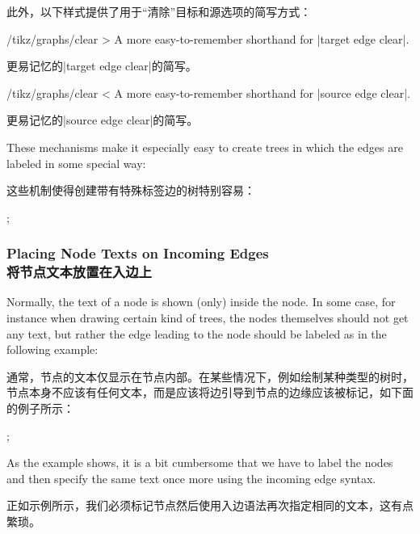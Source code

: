此外，以下样式提供了用于``清除''目标和源选项的简写方式：

\begin{key}{/tikz/graphs/clear >}
    A more easy-to-remember shorthand for |target edge clear|.

    更易记忆的|target edge clear|的简写。
\end{key}
%
\begin{key}{/tikz/graphs/clear <}
    A more easy-to-remember shorthand for |source edge clear|.

    更易记忆的|source edge clear|的简写。

  \end{key}

These mechanisms make it especially easy to create trees in which the edges are
labeled in some special way:

这些机制使得创建带有特殊标签边的树特别容易：
%
\begin{codeexample}[preamble={\usetikzlibrary{graphs,quotes}}]
\tikz
  ;
\end{codeexample}


\subsubsection{Placing Node Texts on Incoming Edges\\将节点文本放置在入边上}

Normally, the text of a node is shown (only) inside the node. In some case, for
instance when drawing certain kind of trees, the nodes themselves should not
get any text, but rather the edge leading to the node should be labeled as in
the following example:

通常，节点的文本仅显示在节点内部。在某些情况下，例如绘制某种类型的树时，节点本身不应该有任何文本，而是应该将边引导到节点的边缘应该被标记，如下面的例子所示：%
\begin{codeexample}[preamble={\usetikzlibrary{graphs,quotes}}]
\tikz {};
\end{codeexample}
%
As the example shows, it is a bit cumbersome that we have to label the nodes
and then specify the same text once more using the incoming edge syntax.

正如示例所示，我们必须标记节点然后使用入边语法再次指定相同的文本，这有点繁琐。

